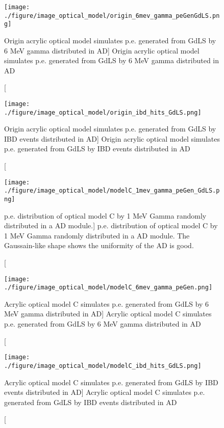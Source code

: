 \begin{figure}
    \centering
    \texttt{[image: ./figure/image\_optical\_model/origin\_6mev\_gamma\_peGenGdLS.png]}
    \caption
    [Origin acrylic optical model simulates p.e. generated from GdLS by 6 MeV gamma distributed in AD]
    {Origin acrylic optical model simulates p.e. generated from GdLS by 6 MeV gamma distributed in AD}
    \label{fig:origin_6mev_gamma_peGenGdLS.png}
    \end{figure}


\begin{figure}
    \centering
    \texttt{[image: ./figure/image\_optical\_model/origin\_ibd\_hits\_GdLS.png]}
    \caption
    [Origin acrylic optical model simulates p.e. generated from GdLS by IBD events distributed in AD]
    {Origin acrylic optical model simulates p.e. generated from GdLS by IBD events distributed in AD}
    \label{fig:origin_6mev_gamma_peGenGdLS.png}
    \end{figure}

\begin{figure}
    \centering
    \label{fig:modelC_1mev_gamma_peGen_GdLS.png}
    \texttt{[image: ./figure/image\_optical\_model/modelC\_1mev\_gamma\_peGen\_GdLS.png]}
    \caption
[p.e. distribution of optical model C by 1 MeV Gamma randomly distributed in a AD module.]
{p.e. distribution of optical model C by 1 MeV Gamma randomly distributed in a AD module. The Gaussain-like shape shows the uniformity of the AD is good.}
    \end{figure}

\begin{figure}
    \centering
    \texttt{[image: ./figure/image\_optical\_model/modelC\_6mev\_gamma\_peGen.png]}
    \caption
    [Acrylic optical model C simulates p.e. generated from GdLS by 6 MeV gamma distributed in AD]
    {Acrylic optical model C simulates p.e. generated from GdLS by 6 MeV gamma distributed in AD}
    \label{fig:modelC_6mev_gamma_peGen.png}
    \end{figure}



\begin{figure}
    \centering
    \texttt{[image: ./figure/image\_optical\_model/modelC\_ibd\_hits\_GdLS.png]}
    \caption
    [Acrylic optical model C simulates p.e. generated from GdLS by IBD events distributed in AD]
    {Acrylic optical model C simulates p.e. generated from GdLS by IBD events distributed in AD}
    \label{fig:modelC_6mev_gamma_peGen.png}
    \end{figure}


